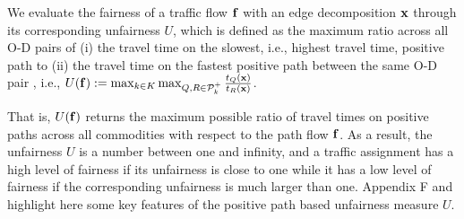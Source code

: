 \documentclass{article}
\newif\ifarxiv   %
\begin{document}
We evaluate the fairness of a traffic flow $\f$ with an edge decomposition $\x$ %
through its corresponding unfairness $U$, which is defined as the maximum ratio across all O-D pairs of (i) the %
travel time on the slowest, i.e., highest travel time, positive path to (ii) the travel time on the fastest positive path between the same O-D pair\ifarxiv:
\begin{align*}
    U(\f) := \max_{k \in K} \max_{Q, R \in \P_k^{+}} \frac{t_Q(\x)}{t_R(\x)}%
    .
\end{align*}
\else
, i.e., $U(\mathbf{f}) := \max_{k \in K}  \max_{Q, R \in \mathcal{P}_k^{+}} \frac{t_Q(\mathbf{x})}{t_R(\mathbf{x})}$.
\fi
That is, $U(\mathbf{f})$ returns the maximum possible ratio of travel times on positive paths across all commodities with respect to the path flow $\f$. As a result, the unfairness $U$ is a number between one and infinity, and a traffic assignment has a high level of fairness if its unfairness is close to one while it has a low level of fairness if the corresponding unfairness is much larger than one. \ifarxiv A discussion on numerically computing the above defined notion of unfairness is presented in Section~\ref{sec:numerical-experiments}. In contrast, other valid notions of unfairness %
could also be considered. For instance, for a given path flow decomposition $\f$ with a corresponding edge flow $\x$, the unfairness $\Tilde{U}(\cdot)$ of the path flows can be evaluated as the maximum ratio between the travel times of any two users travelling between the same O-D pair, i.e., $\Tilde{U}(\f) = \max_{k \in K}  \max_{Q, R \in \P_k: \x_Q, \x_R>0} \frac{t_Q(\x)}{t_R(\x)} $. Note here that we only consider a ratio of travel times on paths with strictly positive flow for the path decomposition $\f$ rather than the ratio of travel times for all positive paths. We defer a detailed treatment of path-based unfairness measures to \ifarxiv Appendix~\ref{apdx:general-unfairness} \else Appendix F \fi and highlight here some key features of the positive path based unfairness measure $U$. 
\end{document}
